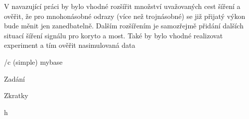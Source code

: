 V navazující práci by bylo vhodné rozšířit množství uvažovaných cest
šíření a ověřit, že pro mnohonásobné odrazy (více než trojnásobné) se již přijatý
výkon bude měnit jen zanedbatelně. Dalším rozšířením je samozřejmě přidání
dalších situací šíření signálu pro koryto a most. Také by bylo vhodné realizovat
experiment a tím ověřit nasimulovaná data

 



 \bibchap
 \usebib/c (simple) mybase

\app Zadání

 

\app Zkratky\par \makeglos %


h
 
 
 \bye
  
 